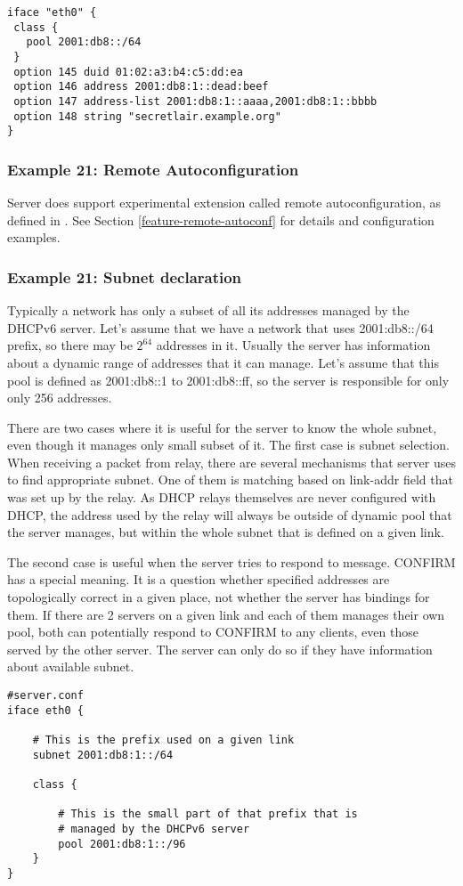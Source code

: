 \begin{lstlisting}
iface "eth0" {
 class {
   pool 2001:db8::/64
 }
 option 145 duid 01:02:a3:b4:c5:dd:ea
 option 146 address 2001:db8:1::dead:beef
 option 147 address-list 2001:db8:1::aaaa,2001:db8:1::bbbb
 option 148 string "secretlair.example.org"
}
\end{lstlisting}


\subsubsection{Example 21: Remote Autoconfiguration}
Server does support experimental extension called remote
autoconfiguration, as defined in \cite{draft-remote-autoconf}. See
Section \ref{feature-remote-autoconf} for details and configuration
examples.

\subsubsection{Example 21: Subnet declaration}
\label{example-server-subnet}
Typically a network has only a subset of all its addresses managed by
the DHCPv6 server. Let's assume that we have a network that uses
2001:db8::/64 prefix, so there may be $2^{64}$ addresses in
it. Usually the server has information about a dynamic range of
addresses that it can manage. Let's assume that this pool is defined
as 2001:db8::1 to 2001:db8::ff, so the server is responsible for only
only 256 addresses.

There are two cases where it is useful for the server to know the
whole subnet, even though it manages only small subset of it. The
first case is subnet selection. When receiving a packet from relay,
there are several mechanisms that server uses to find appropriate
subnet. One of them is matching based on link-addr field that was set
up by the relay. As DHCP relays themselves are never configured with
DHCP, the address used by the relay will always be outside of dynamic
pool that the server manages, but within the whole subnet that is
defined on a given link.

The second case is useful when the server tries to respond
to  message. CONFIRM has a special meaning. It is a
question whether specified addresses are topologically correct in a
given place, not whether the server has bindings for them. If there
are 2 servers on a given link and each of them manages their own pool,
both can potentially respond to CONFIRM to any clients, even those
served by the other server. The server can only do so if they have
information about available subnet.

\begin{lstlisting}
#server.conf
iface eth0 {

    # This is the prefix used on a given link
    subnet 2001:db8:1::/64

    class {

        # This is the small part of that prefix that is
        # managed by the DHCPv6 server
        pool 2001:db8:1::/96
    }
}
\end{lstlisting}
